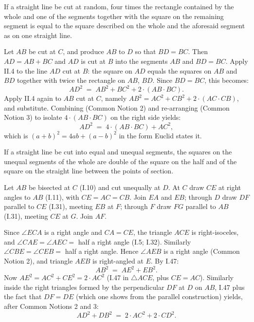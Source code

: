 \begin{claim}
\label{prop:II.8}
If a straight line be cut at random, four times the rectangle
contained by the whole and one of the segments together with the
square on the remaining segment is equal to the square described on
the whole and the aforesaid segment as on one straight line.
\end{claim}
\begin{evidence}[Proof of II.8]
\label{ev:II.8}
Let $AB$ be cut at $C$, and produce $AB$ to $D$ so that $BD = BC$.
Then $AD = AB + BC$ and $AD$ is cut at $B$ into the segments $AB$
and $BD = BC$.  Apply II.4 to the line $AD$ cut at $B$: the square
on $AD$ equals the squares on $AB$ and $BD$ together with twice the
rectangle on $AB$, $BD$.  Since $BD = BC$, this becomes:
\[
    AD^2 \;=\; AB^2 + BC^2 + 2\cdot(AB\cdot BC).
\]
Apply II.4 again to $AB$ cut at $C$, namely $AB^2 = AC^2 + CB^2 +
2\cdot(AC\cdot CB)$, and substitute.  Combining (Common Notion 2)
and re-arranging (Common Notion 3) to isolate $4\cdot(AB\cdot BC)$
on the right side yields:
\[
    AD^2 \;=\; 4\cdot(AB\cdot BC) + AC^2,
\]
which is $(a+b)^2 = 4ab + (a-b)^2$ in the form Euclid states it.
\end{evidence}

\begin{claim}
\label{prop:II.9}
If a straight line be cut into equal and unequal segments, the
squares on the unequal segments of the whole are double of the square
on the half and of the square on the straight line between the points
of section.
\end{claim}
\begin{evidence}[Proof of II.9]
\label{ev:II.9}
Let $AB$ be bisected at $C$ (I.10) and cut unequally at $D$.  At $C$
draw $CE$ at right angles to $AB$ (I.11), with $CE = AC = CB$.  Join
$EA$ and $EB$; through $D$ draw $DF$ parallel to $CE$ (I.31), meeting
$EB$ at $F$; through $F$ draw $FG$ parallel to $AB$ (I.31), meeting
$CE$ at $G$.  Join $AF$.

Since $\angle ECA$ is a right angle and $CA = CE$, the triangle
$ACE$ is right-isoceles, and $\angle CAE = \angle AEC = $ half a right
angle (I.5; I.32).  Similarly $\angle CBE = \angle CEB = $ half a
right angle.  Hence $\angle AEB$ is a right angle (Common Notion 2),
and triangle $AEB$ is right-angled at $E$.  By I.47:
\[
    AB^2 \;=\; AE^2 + EB^2.
\]
Now $AE^2 = AC^2 + CE^2 = 2\cdot AC^2$ (I.47 in $\triangle ACE$,
plus $CE = AC$).  Similarly inside the right triangles formed by the
perpendicular $DF$ at $D$ on $AB$, I.47 plus the fact that
$DF = DE$ (which one shows from the parallel construction)
yields, after Common Notions 2 and 3:
\[
    AD^2 + DB^2 \;=\; 2\cdot AC^2 + 2\cdot CD^2.
\]
\end{evidence}

